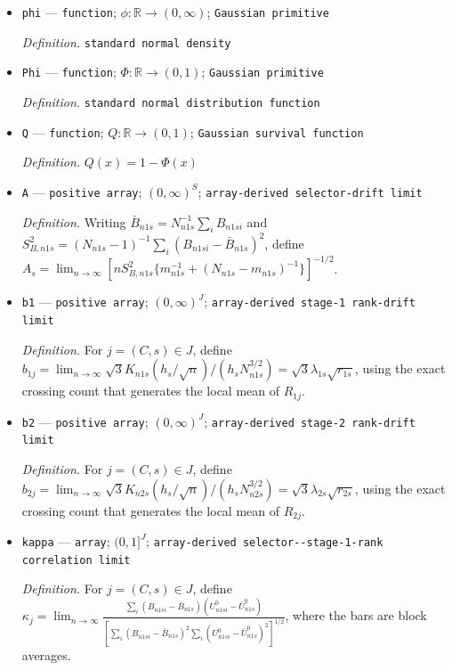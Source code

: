 \documentclass{article}
\begin{document}
\begin{itemize}
  \item \texttt{phi} --- \texttt{function}; \(\phi:\mathbb{R}\to(0,\infty)\); \texttt{Gaussian primitive}
  \par\smallskip\noindent\emph{Definition.} \texttt{standard normal density}
  \item \texttt{Phi} --- \texttt{function}; \(\Phi:\mathbb{R}\to(0,1)\); \texttt{Gaussian primitive}
  \par\smallskip\noindent\emph{Definition.} \texttt{standard normal distribution function}
  \item \texttt{Q} --- \texttt{function}; \(Q:\mathbb{R}\to(0,1)\); \texttt{Gaussian survival function}
  \par\smallskip\noindent\emph{Definition.} \(Q(x)=1-\Phi(x)\)
  \item \texttt{A} --- \texttt{positive array}; \((0,\infty)^S\); \texttt{array-\allowbreak{}derived selector-\allowbreak{}drift limit}
  \par\smallskip\noindent\emph{Definition.} Writing \(\bar B_{n1s}=N_{n1s}^{-1}\sum_iB_{n1si}\) and \(S^2_{B,n1s}=(N_{n1s}-1)^{-1}\sum_i(B_{n1si}-\bar B_{n1s})^2\), define \(A_s=\lim_{n\to\infty}[nS^2_{B,n1s}\{m_{n1s}^{-1}+(N_{n1s}-m_{n1s})^{-1}\}]^{-1/2}\).
  \item \texttt{b1} --- \texttt{positive array}; \((0,\infty)^J\); \texttt{array-\allowbreak{}derived stage-\allowbreak{}1 rank-\allowbreak{}drift limit}
  \par\smallskip\noindent\emph{Definition.} For \(j=(C,s)\in J\), define \(b_{1j}=\lim_{n\to\infty}\sqrt3K_{n1s}(h_s/\sqrt n)/(h_sN_{n1s}^{3/2})=\sqrt3\lambda_{1s}\sqrt{r_{1s}}\), using the exact crossing count that generates the local mean of \(R_{1j}\).
  \item \texttt{b2} --- \texttt{positive array}; \((0,\infty)^J\); \texttt{array-\allowbreak{}derived stage-\allowbreak{}2 rank-\allowbreak{}drift limit}
  \par\smallskip\noindent\emph{Definition.} For \(j=(C,s)\in J\), define \(b_{2j}=\lim_{n\to\infty}\sqrt3K_{n2s}(h_s/\sqrt n)/(h_sN_{n2s}^{3/2})=\sqrt3\lambda_{2s}\sqrt{r_{2s}}\), using the exact crossing count that generates the local mean of \(R_{2j}\).
  \item \texttt{kappa} --- \texttt{array}; \((0,1]^J\); \texttt{array-\allowbreak{}derived selector-\allowbreak{}-\allowbreak{}stage-\allowbreak{}1-\allowbreak{}rank correlation limit}
  \par\smallskip\noindent\emph{Definition.} For \(j=(C,s)\in J\), define \(\kappa_j=\lim_{n\to\infty}\frac{\sum_i(B_{n1si}-\bar B_{n1s})(U^0_{n1si}-\bar U^0_{n1s})}{[\sum_i(B_{n1si}-\bar B_{n1s})^2\sum_i(U^0_{n1si}-\bar U^0_{n1s})^2]^{1/2}}\), where the bars are block averages.

\end{itemize}
\end{document}
